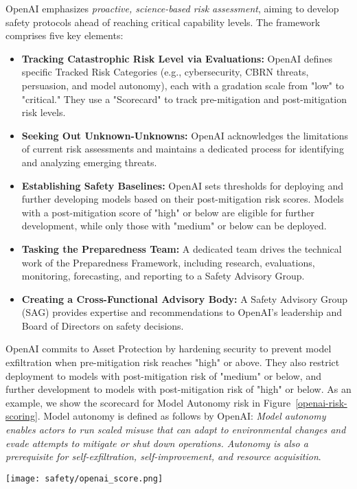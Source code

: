 OpenAI emphasizes \textit{proactive, science-based risk assessment}, aiming to develop safety protocols ahead of reaching critical capability levels. The framework comprises five key elements:
\begin{itemize}
    \item \textbf{Tracking Catastrophic Risk Level via Evaluations:} OpenAI defines specific Tracked Risk Categories (e.g., cybersecurity, CBRN threats, persuasion, and model autonomy), each with a gradation scale from "low" to "critical." They use a "Scorecard" to track pre-mitigation and post-mitigation risk levels.
    \item \textbf{Seeking Out Unknown-Unknowns:} OpenAI acknowledges the limitations of current risk assessments and maintains a dedicated process for identifying and analyzing emerging threats.
    \item \textbf{Establishing Safety Baselines:} OpenAI sets thresholds for deploying and further developing models based on their post-mitigation risk scores. Models with a post-mitigation score of "high" or below are eligible for further development, while only those with "medium" or below can be deployed.  
    \item \textbf{Tasking the Preparedness Team:} A dedicated team drives the technical work of the Preparedness Framework, including research, evaluations, monitoring, forecasting, and reporting to a Safety Advisory Group. 
    \item \textbf{Creating a Cross-Functional Advisory Body:} A Safety Advisory Group (SAG) provides expertise and recommendations to OpenAI's leadership and Board of Directors on safety decisions. 
\end{itemize}

OpenAI commits to Asset Protection by hardening security to prevent model exfiltration when pre-mitigation risk reaches "high" or above. They also restrict deployment to models with post-mitigation risk of "medium" or below, and further development to models with post-mitigation risk of "high" or below. As an example, we show the scorecard for Model Autonomy risk in Figure~\ref{openai-risk-scoring}. Model autonomy is defined as follows by OpenAI: \textit{Model autonomy enables actors to run scaled misuse that can adapt to environmental changes and evade attempts to mitigate or shut down operations. Autonomy is also a prerequisite for self-exfiltration, self-improvement, and resource acquisition}.

\begin{figure*}[h!]
\centering
\texttt{[image: safety/openai\_score.png]}
\caption{OpenAI's Preparedness Framework risk scoring methodology showing the gradation scale from "low" to "critical" model autonomy risk \cite{openai2024preparedness}. }
\label{openai-risk-scoring}
\end{figure*}

